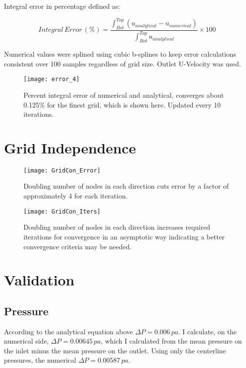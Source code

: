 \documentclass[10pt,english]{article}
\begin{document}
\noindent Integral error in percentage defined as:

    \begin{equation}
       Integral\,Error\,(\%) = \frac{\int_{Bot}^{Top}{(u_{analytical}-u_{numerical})}}{\int_{Bot}^{Top}{u_{analytical}}} \times 100
    \end{equation}
    
\noindent Numerical values were splined using cubic b-splines to keep error calculations consistent over 100 samples regardless of grid size.  Outlet U-Velocity was used.


\begin{figure}[H]
\centering
\texttt{[image: error\_4]}
\vspace{-5pt}
\caption{Percent integral error of numerical and analytical, converges about 0.125\% for the finest grid, which is shown here. Updated every 10 iterations.}
\label{f:3b}
\end{figure}

\FloatBarrier
\vspace{5pt}
\section{Grid Independence}


\begin{figure}[htbp]
\centering
\texttt{[image: GridCon\_Error]}
\vspace{-5pt}
\caption{Doubling number of nodes in each direction cuts error by a factor of approximately 4 for each iteration.}
\label{f:3b}
\end{figure}


\begin{figure}[H]
\centering
\texttt{[image: GridCon\_Iters]}
\vspace{-5pt}
\caption{Doubling number of nodes in each direction increases required iterations for convergence in an asymptotic way indicating a better convergence criteria may be needed.}
\label{f:3b}
\end{figure}

\section{Validation}

\subsection{Pressure}
According to the analytical equation above  $\Delta P = 0.006\,pa$.  I calculate, on the numerical side, $\Delta P = 0.00645\,pa$, which I calculated from the mean pressure on the inlet minus the mean pressure on the outlet.  Using only the centerline pressures, the numerical $\Delta P = 0.00587\,pa$.\\
\end{document}
